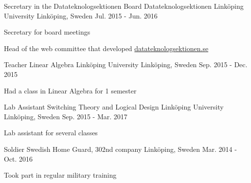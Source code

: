 

\begin{cventries}

  \cventry
    {Secretary in the Datateknologsektionen Board} %
    {Datateknologsektionen Linköping University} %
    {Linköping, Sweden} %
    {Jul. 2015 - Jun. 2016} %
    {
      \begin{cvitems} %
        \item {Secretary for board meetings}
        \item {Head of the web committee that developed \href{https://d-sektionen.se/}{datateknologsektionen.se}}
      \end{cvitems}
    }

  \cventry
  {Teacher Linear Algebra} %
  {Linköping University} %
  {Linköping, Sweden} %
  {Sep. 2015 - Dec. 2015} %
  {
    \begin{cvitems} %
      \item {Had a class in Linear Algebra for 1 semester}
    \end{cvitems}
  }


  \cventry
  {Lab Assistant Switching Theory and Logical Design} %
  {Linköping University} %
  {Linköping, Sweden} %
  {Sep. 2015 - Mar. 2017} %
  {
    \begin{cvitems} %
      \item {Lab assistant for several classes}
    \end{cvitems}
  }


  \cventry
  {Soldier} %
  {Swedish Home Guard, 302nd company} %
  {Linköping, Sweden} %
  {Mar. 2014 - Oct. 2016} %
  {
    \begin{cvitems} %
      \item {Took part in regular military training}
    \end{cvitems}
  }


\end{cventries}
